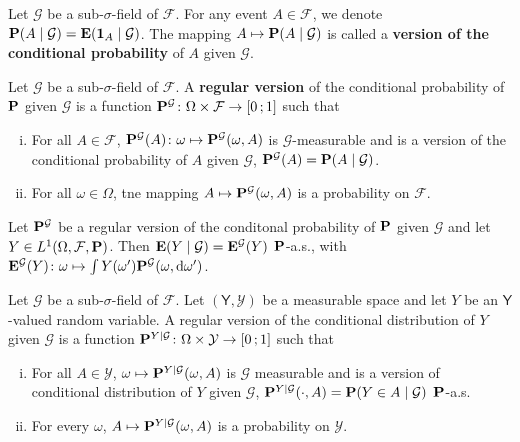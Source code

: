 	\begin{defn}
		Let $\mathcal{G}$ be a sub-$\sigma$-field of $\mathcal{F}$.
		For any event $A \in \mathcal{F}$, we denote $\mathbf{P}(A \mid \mathcal{G}) = \mathbf{E}(\operatorname{\mathbf{1}}_A \mid \mathcal{G})$.
		The mapping $A \mapsto \mathbf{P}(A \mid \mathcal{G})$ is called a \textbf{version of the conditional probability} of $A$ given $\mathcal{G}$.
	\end{defn}

	\begin{defn}
		Let $\mathcal{G}$ be a sub-$\sigma$-field of $\mathcal{F}$.
		A \textbf{regular version} of the conditional probability of $\mathbf{P}$ given $\mathcal{G}$ is a function $\mathbf{P}^{\mathcal{G}} \colon \Omega \times \mathcal{F} \to \mathopen{}\mathclose{\left[0\mathclose{}\mathpunct{};1\right]}$ such that
		\begin{enumerate}[(i)]
			\item For all $A \in \mathcal{F}$, $\mathbf{P}^{\mathcal{G}}(A) \colon \omega \mapsto \mathbf{P}^{\mathcal{G}}(\omega, A)$ is $\mathcal{G}$-measurable and is a version of the conditional probability of $A$ given $\mathcal{G}$, $\mathbf{P}^{\mathcal{G}}(A) = \mathbf{P}(A \mid \mathcal{G})$.
			\item For all $\omega \in \Omega$, tne mapping $A \mapsto \mathbf{P}^{\mathcal{G}}(\omega, A)$ is a probability on $\mathcal{F}$.
		\end{enumerate}
	\end{defn}
	
	\begin{lem}
		Let $\mathbf{P}^{\mathcal{G}}$ be a regular version of the conditonal probability of $\mathbf{P}$ given $\mathcal{G}$ and let $Y \in L^1(\Omega, \mathcal{F}, \mathbf{P})$.
		Then $\mathbf{E}(Y \mid \mathcal{G}) = \mathbf{E}^{\mathcal{G}}(Y)$ $\mathbf{P}$-a.s., with $\mathbf{E}^{\mathcal{G}}(Y) \colon \omega \mapsto \int Y(\omega') \mathbf{P}^{\mathcal{G}}(\omega, \mathop{}\mathopen{}\mathrm{d} \omega')$.
	\end{lem}

	\begin{defn}
		Let $\mathcal{G}$ be a sub-$\sigma$-field of $\mathcal{F}$.
		Let $(\mathsf{Y}, \mathcal{Y})$ be a measurable space and let $Y$ be an $\mathsf{Y}$-valued random variable.
		A regular version of the conditional distribution of $Y$ given $\mathcal{G}$ is a function $\mathbf{P}^{Y \mid \mathcal{G}} \colon \Omega \times \mathcal{Y} \to \mathopen{}\mathclose{\left[0\mathclose{}\mathpunct{};1\right]}$ such that
		\begin{enumerate}[(i)]
			\item For all $A \in \mathcal{Y}$, $\omega \mapsto \mathbf{P}^{Y \mid \mathcal{G}}(\omega, A)$ is $\mathcal{G}$ measurable and is a version of conditional distribution of $Y$ given $\mathcal{G}$, $\mathbf{P}^{Y \mid \mathcal{G}}(\cdot, A) = \mathbf{P}(Y \in A \mid \mathcal{G})$ $\mathbf{P}$-a.s.
			\item For every $\omega$, $A \mapsto \mathbf{P}^{Y \mid \mathcal{G}}(\omega, A)$ is a probability on $\mathcal{Y}$.
		\end{enumerate}
	\end{defn}

